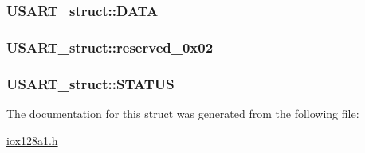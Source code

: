 \label{struct_u_s_a_r_t__struct_aee1ddff9650e8f97f0c76c525a7ed20b}
\hypertarget{struct_u_s_a_r_t__struct_ab03b25929825b988cf5bc0287ee3ce74}{
\subsubsection[{DATA}]{ {\bf USART\_\-struct::DATA}}}
\label{struct_u_s_a_r_t__struct_ab03b25929825b988cf5bc0287ee3ce74}
\hypertarget{struct_u_s_a_r_t__struct_ac808256f59ffae1393d381b975d5ed62}{
\subsubsection[{reserved\_\-0x02}]{ {\bf USART\_\-struct::reserved\_\-0x02}}}
\label{struct_u_s_a_r_t__struct_ac808256f59ffae1393d381b975d5ed62}
\hypertarget{struct_u_s_a_r_t__struct_a4f322c93a676dd8b8cec47b8439c0391}{
\subsubsection[{STATUS}]{ {\bf USART\_\-struct::STATUS}}}
\label{struct_u_s_a_r_t__struct_a4f322c93a676dd8b8cec47b8439c0391}


The documentation for this struct was generated from the following file:\begin{DoxyCompactItemize}
\item 
\hyperlink{iox128a1_8h}{iox128a1.h}\end{DoxyCompactItemize}

